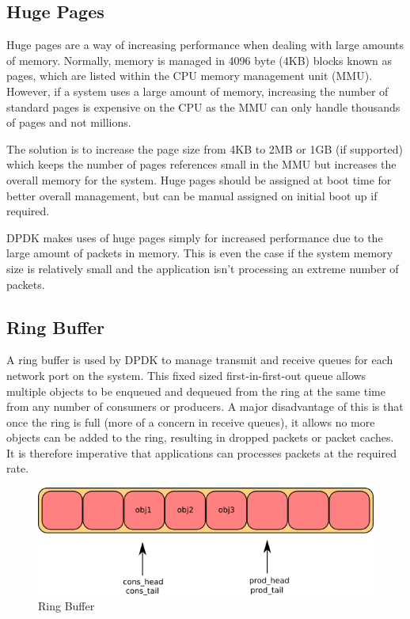 \documentclass[final_report.tex]{subfiles}
\begin{document}
\subsection{Huge Pages}
\label{subsec:hugepages}
Huge pages are a way of increasing performance when dealing with large amounts of memory. Normally, memory is managed in 4096 byte (4KB) blocks known as pages, which are listed within the CPU memory management unit (MMU). However, if a system uses a large amount of memory, increasing the number of standard pages is expensive on the CPU as the MMU can only handle thousands of pages and not millions.

The solution is to increase the page size from 4KB to 2MB or 1GB (if supported) which keeps the number of pages references small in the MMU but increases the overall memory for the system. Huge pages should be assigned at boot time for better overall management, but can be manual assigned on initial boot up if required.

DPDK makes uses of huge pages simply for increased performance due to the large amount of packets in memory. This is even the case if the system memory size is relatively small and the application isn't processing an extreme number of packets.

\subsection{Ring Buffer}
A ring buffer is used by DPDK to manage transmit and receive queues for each network port on the system. This fixed sized first-in-first-out queue allows multiple objects to be enqueued and dequeued from the ring at the same time from any number of consumers or producers. A major disadvantage of this is that once the ring is full (more of a concern in receive queues), it allows no more objects can be added to the ring, resulting in dropped packets or packet caches. It is therefore imperative that applications can processes packets at the required rate.

\begin{figure}[H]
	\centering
	\includegraphics[width=\textwidth]{img/ring.png}
	\caption{Ring Buffer}
	\label{fig:ring}
\end{figure}
\end{document}
